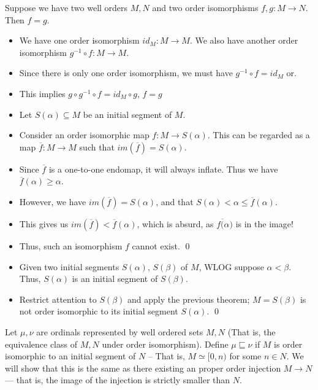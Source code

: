 \documentclass{article}
\newcommand{\sqleq}{\sqsubseteq}
\begin{document}
 Suppose we have two well orders $M, N$  and two
order isomorphisms $f, g: M \rightarrow N$. Then $f = g$.
\begin{itemize}
        \item We have one order isomorphism $id_M: M \rightarrow M$. We also have another order isomorphism $g^{-1} \circ f : M \rightarrow M$.
        \item Since there is only one order isomorphism, we must have $g^{-1} \circ f = id_M$ or.
        \item This implies $g \circ g^{-1} \circ f = id_M \circ g$, $f = g$ 
\end{itemize}

\begin{itemize}
        \item Let $S(\alpha) \subseteq M$ be an initial segment of $M$.
        \item Consider an order isomorphic map $f: M \rightarrow S(\alpha)$. This can be regarded as a map $\overline{f}: M \rightarrow M$ such that $im(\overline{f}) = S(\alpha)$.
        \item Since $\overline f$ is a one-to-one endomap, it will always inflate. Thus we have $\overline f(\alpha) \geq \alpha$.
        \item However, we have $im(\overline f) = S(\alpha)$, and that $S(\alpha) < \alpha \leq \overline f(\alpha) $.
        \item This gives us $im(\overline f) < \overline f(\alpha)$, which is absurd, as $f\overline (\alpha)$ is in the image!
        \item Thus, such an isomorphism $f$ cannot exist. \qed
\end{itemize}

\begin{itemize}
    \item Given two initial segments $S(\alpha)$, $S(\beta)$ of $M$, WLOG suppose $\alpha < \beta$. Thus, $S(\alpha)$ is an initial segment of $S(\beta)$.
    \item Restrict attention to $S(\beta)$ and apply the previous theorem; $M = S(\beta)$ is not order isomorphic to its initial segment $S(\alpha)$. \qed
\end{itemize}

\start{Definition of $\sqleq$} Let $\mu, \nu$ are ordinals represented by well
ordered sets $M, N$ (That is, the equivalence class of $M, N$ under order
isomorphism). Define $\mu \sqleq \nu$ if $M$ is order isomorphic
to an initial segment of $N$ -- That is, $M \simeq [0, n)$ for some $n \in N$.
We will show that this is the same as there existing an proper order injection $M \rightarrow N$ --- that is,
the image of the injection is strictly smaller than $N$. 
\end{document}
